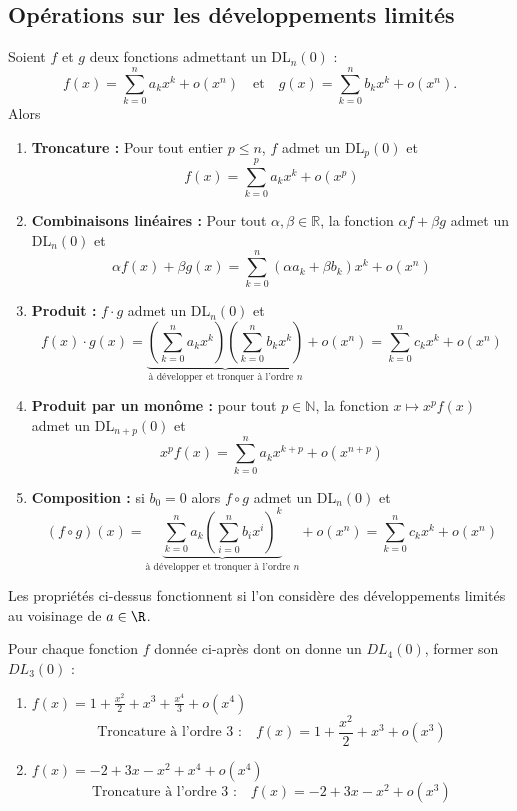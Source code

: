 \subsection{Opérations sur les développements limités}


\begin{Thm}
Soient \(f\) et \(g\) deux fonctions admettant un DL\(_n(0)\) :
\[
f(x) = \sum_{k=0}^{n} a_k x^k + o(x^n) \quad \text{et} \quad g(x) = \sum_{k=0}^{n} b_k x^k + o(x^n).
\]
Alors
\begin{enumerate}
    \item \textbf{Troncature :} Pour tout entier \(p \leq n\), \(f\) admet un DL\(_p(0)\) et
    \[
    f(x) = \sum_{k=0}^{p} a_k x^k + o(x^p)
    \]
    \item \textbf{Combinaisons linéaires :} Pour tout \(\alpha, \beta \in \mathbb{R}\), la fonction \(\alpha f + \beta g\) admet un DL\(_n(0)\) et
    \[
    \alpha f(x) + \beta g(x) = \sum_{k=0}^{n} (\alpha a_k + \beta b_k) x^k + o(x^n)
    \]
    \item \textbf{Produit :} \(f \cdot g\) admet un DL\(_n(0)\) et
    \[
    f(x) \cdot g(x) = \underbrace{\left( \sum_{k=0}^{n} a_k x^k \right) \left( \sum_{k=0}^{n} b_k x^k \right)}_{\text{à développer et tronquer à l’ordre } n} + o(x^n) = \sum_{k=0}^{n} c_k x^k + o(x^n)
    \]
    \item \textbf{Produit par un monôme :} pour tout \(p \in \mathbb{N}\), la fonction \(x \mapsto x^p f(x)\) admet un DL\(_{n+p}(0)\) et
    \[
    x^p f(x) = \sum_{k=0}^{n} a_k x^{k+p} + o(x^{n+p})
    \]
    \item \textbf{Composition :} si \(b_0 = 0\) alors \(f \circ g\) admet un DL\(_n(0)\) et
    \[
    (f \circ g)(x) = \underbrace{\sum_{k=0}^{n} a_k \left( \sum_{i=0}^{n} b_i x^i \right)^k }_{\text{à développer et tronquer à l’ordre } n} + o(x^n) = \sum_{k=0}^{n} c_k x^k + o(x^n)
    \]
\end{enumerate}


\end{Thm}

\begin{Rem}
Les propriétés ci-dessus fonctionnent si l’on considère des développements limités au voisinage
de $a \in \R$.\\
\end{Rem}

\begin{Ex}
Pour chaque fonction \( f \) donnée ci-après dont on donne un \( DL_4(0) \), former son \( DL_3(0) \) :
\begin{enumerate}
    \item \( f(x) = 1 + \frac{x^2}{2} + x^3 + \frac{x^4}{3} + o(x^4) \)
    \[
    \text{Troncature à l’ordre 3 :} \quad f(x) = 1 + \frac{x^2}{2} + x^3 + o(x^3)
    \]
    \item \( f(x) = -2 + 3x - x^2 + x^4 + o(x^4) \)
    \[
    \text{Troncature à l’ordre 3 :} \quad f(x) = -2 + 3x - x^2 + o(x^3)
    \]
\end{enumerate}
\end{Ex}


